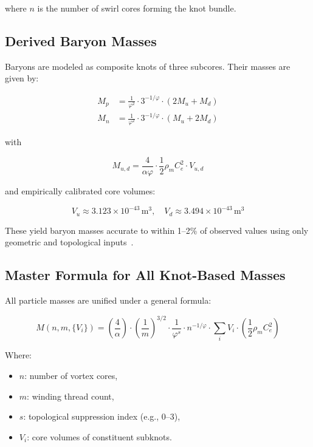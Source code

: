 \documentclass[preprint]{revtex4-2}
\begin{document}
    where \( n \) is the number of swirl cores forming the knot bundle.

    \subsection{Derived Baryon Masses}
    Baryons are modeled as composite knots of three subcores. Their masses are given by:

    \begin{align}
    M_p &= \frac{1}{\varphi^2} \cdot 3^{-1/\varphi} \cdot (2 M_u + M_d) \\
    M_n &= \frac{1}{\varphi^2} \cdot 3^{-1/\varphi} \cdot (M_u + 2 M_d)
    \end{align}

    with

    \begin{equation}
    M_{u,d} = \frac{4}{\alpha \varphi} \cdot \frac{1}{2} \rho_{\scriptscriptstyle\boldsymbol\!m} C_e^2 \cdot V_{u,d}
    \end{equation}

    and empirically calibrated core volumes:

    \begin{equation}
    V_u \approx 3.123 \times 10^{-43} \, \text{m}^3, \quad V_d \approx 3.494 \times 10^{-43} \, \text{m}^3
    \end{equation}

    These yield baryon masses accurate to within 1–2\% of observed values using only geometric and topological inputs~\cite{kleckner2013creation}.

    \subsection{Master Formula for All Knot-Based Masses}
    All particle masses are unified under a general formula:

    \begin{equation}
    M(n, m, \{V_i\}) = \left( \frac{4}{\alpha} \right) \cdot \left( \frac{1}{m} \right)^{3/2} \cdot \frac{1}{\varphi^s} \cdot n^{-1/\varphi} \cdot \sum_i V_i \cdot \left( \frac{1}{2} \rho_{\scriptscriptstyle\boldsymbol\!m} C_e^2 \right)
    \label{eq:mass_master}
    \end{equation}

    Where:
    \begin{itemize}
        \item \( n \): number of vortex cores,
        \item \( m \): winding thread count,
        \item \( s \): topological suppression index (e.g., 0–3),
        \item \( V_i \): core volumes of constituent subknots.
    \end{itemize}
\end{document}
